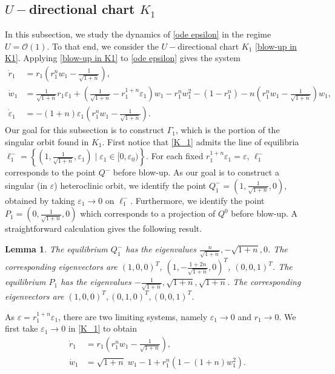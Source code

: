\documentclass[10pt,a4paper]{amsart}
\newtheorem{lem}{Lemma}
\begin{document}
\subsection{$U-$directional chart $K_1$}
In this subsection, we study the dynamics of \eqref{ode epsilon} in the regime $U=\mathcal{O}(1)$. To that end, we consider the $U-$directional chart $K_1$ \eqref{blow-up in K1}. 
Applying \eqref{blow-up in K1} to \eqref{ode epsilon} gives the system 
\begin{equation}
    \begin{aligned}
        \dot{r}_1&=r_1\left(r_1^nw_1-\tfrac{1}{\sqrt{1+n}}\right),\\
        \dot{w}_1&=\tfrac{1}{\sqrt{1+n}}r_1\varepsilon_1+\left(\tfrac{1}{\sqrt{1+n}}-r_1^{1+n}\varepsilon_1\right)w_1-r_1^nw_1^2-(1-r_1^n)-n\left(r_1^nw_1-\tfrac{1}{\sqrt{1+n}}\right)w_1,\\
        \dot{\varepsilon}_1&=-(1+n)\varepsilon_1\left(r_1^nw_1-\tfrac{1}{\sqrt{1+n}}\right).
        \label{K_1}
    \end{aligned}
\end{equation}
Our goal for this subsection is to construct $\Gamma_1$, which is the portion of the singular orbit found in $K_1$.
First notice that \eqref{K_1} admits the line of equilibria  $\ell_1^-=\left\{\left(1, \tfrac{1}{\sqrt{1+n}}, \varepsilon_1\right)\;\bigg|\;\varepsilon_1\in[0, \varepsilon_0)\right\}$. For each fixed $r_1^{1+n}\varepsilon_1=\varepsilon$, $\ell_1^-$ corresponds to the point $Q^-$ before blow-up. As our goal is to construct a singular (in $\varepsilon$) heteroclinic orbit, we identify the point $Q_1^-=\left(1, \tfrac{1}{\sqrt{1+n}}, 0\right)$, obtained by taking $\varepsilon_1\to0$ on $\ell_1^-$. Furthermore, we identify the point $P_1=\left(0,\tfrac{1}{\sqrt{1+n}} ,0\right)$ which corresponds to a projection of $Q^0$ before blow-up. A straightforward calculation gives the following result.
\begin{lem} 
    The equilibrium $Q_1^-$ has the eigenvalues $\tfrac{n}{\sqrt{1+n}}, -\sqrt{1+n}, 0$. The corresponding eigenvectors are $(1,0,0)^T$, $\left(1,-\tfrac{1+2n}{\sqrt{1+n}},0\right)^T$, $(0,0,1)^T$.
    The equilibrium $P_1$ has the eigenvalues $-\tfrac{1}{\sqrt{1+n}}, \sqrt{1+n}, \sqrt{1+n}$. The corresponding eigenvectors are $(1,0,0)^T,(0,1,0)^T, (0,0,1)^T$.
\end{lem}
As $\varepsilon=r_1^{1+n}\varepsilon_1$, there are two limiting systems, namely $\varepsilon_1\to0$ and $r_1\to0$. We first take $\varepsilon_1\to 0$ in \eqref{K_1} to obtain 
\begin{equation}
    \begin{aligned}
        \dot{r}_1&=r_1\left(r_1^n w_1-\tfrac{1}{\sqrt{1+n}}\right),\\
        \dot{w}_1&=\sqrt{1+n}\;w_1-1+r_1^n(1-(1+n)w_1^2).
        \label{K_1 eps_1=0}
    \end{aligned}
\end{equation}
\end{document}
